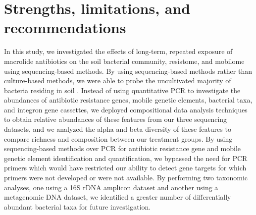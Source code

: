 

\section{Strengths, limitations, and recommendations}

In this study, we investigated the effects of long-term, repeated exposure of macrolide antibiotics on the soil bacterial community, resistome, and mobilome using sequencing-based methods.
By using sequencing-based methods rather than culture-based methods, we were able to probe the uncultivated majority of bacteria residing in soil \parencite{Whitman.1998}.
Instead of using quantitative PCR to investigate the abundances of antibiotic resistance genes, mobile genetic elements, bacterial taxa, and integron gene cassettes, we deployed compositional data analysis techniques to obtain relative abundances of these features from our three sequencing datasets, and we analyzed the alpha and beta diversity of these features to compare richness and composition between our treatment groups.
By using sequencing-based methods over PCR for antibiotic resistance gene and mobile genetic element identification and quantification, we bypassed the need for PCR primers which would have restricted our ability to detect gene targets for which primers were not developed or were not available.
By performing two taxonomic analyses, one using a 16S rDNA amplicon dataset and another using a metagenomic DNA dataset, we identified a greater number of differentially abundant bacterial taxa for future investigation.

